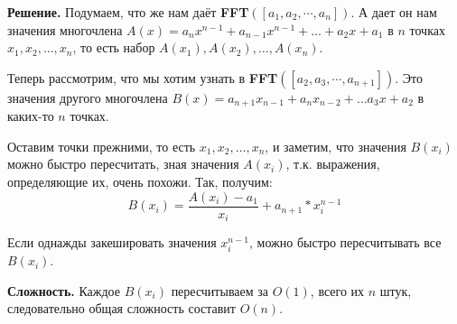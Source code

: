 \begin{enumerate}
	\textbf{Решение.} Подумаем, что же нам даёт \textbf{FFT}$([a_1, a_2, \cdots , a_n])$. А дает он нам значения 
	многочлена $A(x) = a_n x^{n - 1} + a_{n - 1} x^{n - 1} + \dots + a_2 x + a_1$ в $n$ точках $x_1, x_2, \dots, 
	x_n$, то есть набор $A(x_1), A(x_2), \dots, A(x_n)$.
	
	Теперь рассмотрим, что мы хотим узнать в \textbf{FFT}$([a_2, a_3, \cdots , a_{n+1}])$. Это значения другого 
	многочлена $B(x) = a_{n + 1} x_{n - 1} + a_n x_{n - 2} + \dots a_3 x + a_2$ в каких-то $n$ точках. 
	
	Оставим точки прежними, то есть  $x_1, x_2, \dots, x_n$, и заметим, что значения $B(x_i)$ можно быстро 
	пересчитать, зная значения $A(x_i)$, т.к. выражения, определяющие их, очень похожи. Так, получим:
	\begin{equation*}
		B(x_i) = \frac{A(x_i) - a_1}{x_i} + a_{n + 1} * x_i^{n - 1}
	\end{equation*}
	
	Если однажды закешировать значения $x_i^{n - 1}$, можно быстро пересчитывать все $B(x_i)$. 
	
	\textbf{Сложность.} Каждое $B(x_i)$ пересчитываем за $O(1)$, всего их $n$ штук, следовательно общая сложность 
	составит $O(n)$.
	
\end{enumerate}

